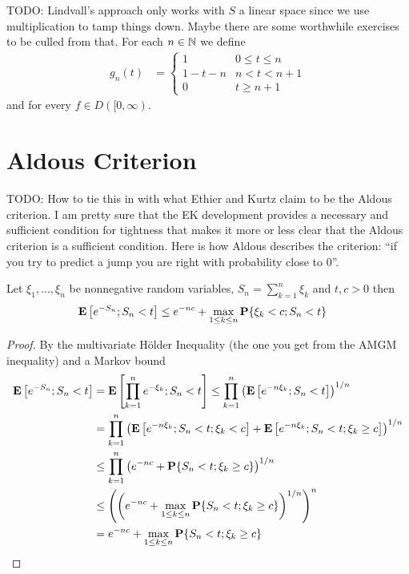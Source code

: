 TODO: Lindvall's approach only works with $S$ a linear space since we use multiplication to tamp things down.  Maybe there are some worthwhile exercises to be culled from that.
For each $n \in \mathbb{N}$ we define 
\begin{align*}
g_n(t) &= \begin{cases}
1 & 0 \leq t \leq n \\
1 - t - n & n < t < n + 1 \\
0 & t \geq n+1
\end{cases}
\end{align*}
and for every $f \in D([0,\infty)$.

\section{Aldous Criterion}

TODO: How to tie this in with what Ethier and Kurtz claim to be the Aldous criterion.  I am pretty sure that the EK development provides a necessary and sufficient condition for tightness that makes it more or less clear that the Aldous criterion is a sufficient condition.
Here is how Aldous describes the criterion: ``if you try to predict a jump you are right with probability close to 0''.

\begin{lem}\label{AldousCriterionExponentialEstimate}Let $\xi_1, \dotsc, \xi_n$ be nonnegative random variables, $S_n = \sum_{k=1}^n \xi_k$ and $t,c > 0$ then
\begin{align*}
\textbf{E}\left[e^{-S_n}; S_n < t\right] &\leq e^{-nc} + \max_{1 \leq k \leq n} \textbf{P}\{\xi_k < c; S_n < t\}
\end{align*}
\end{lem}
\begin{proof}
By the multivariate H\"{o}lder Inequality (the one you get from the AMGM inequality) and a Markov bound
\begin{align*}
\textbf{E}\left[e^{-S_n}; S_n < t\right] &= \textbf{E}\left[\prod_{k=1}^n e^{-\xi_k}; S_n < t\right] \leq \prod_{k=1}^n\left(\textbf{E}\left[ e^{-n\xi_k}; S_n < t\right] \right)^{1/n} \\
&=\prod_{k=1}^n\left(\textbf{E}\left[ e^{-n\xi_k}; S_n < t; \xi_k < c\right] + \textbf{E}\left[ e^{-n\xi_k}; S_n < t; \xi_k \geq c\right] \right)^{1/n}  \\
&\leq\prod_{k=1}^n\left(e^{-nc}+ \textbf{P}\{S_n < t; \xi_k \geq c\} \right)^{1/n}  \\
&\leq \left(\left(e^{-nc} + \max_{1 \leq k \leq n} \textbf{P}\{S_n < t; \xi_k \geq c\} \right)^{1/n} \right)^n \\
&= e^{-nc} + \max_{1 \leq k \leq n} \textbf{P}\{S_n < t; \xi_k \geq c\} \\
\end{align*}
\end{proof}

